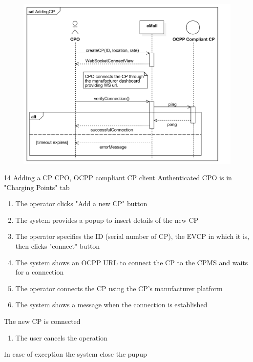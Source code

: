 \pagebreak
\usecase
{
    \begin{figure}[H]
        \centering
        \includegraphics[scale=0.9]{src/sequence_diagram/addingCP.png}
    \end{figure}
}
{14}
{Adding a CP} %
{CPO, OCPP compliant CP client} %
{Authenticated CPO is in "Charging Points" tab} %
{ %
    \begin{enumerate}
        \item The operator clicks "Add a new CP" button
        \item The system provides a popup to insert details of the new CP
        \item The operator specifies the ID (serial number of CP), the EVCP in which it is, then clicks "connect" button
        \item The system shows an OCPP URL to connect the CP to the CPMS and waits for a connection
        \item The operator connects the CP using the CP's manufacturer platform
        \item The system shows a message when the connection is established
    \end{enumerate}
}
{The new CP is connected} %
{ %
    \begin{enumerate}
        \item The user cancels the operation
    \end{enumerate}
}
{ %
    In case of exception the system close the pupup
}

